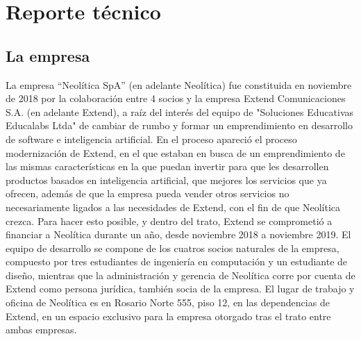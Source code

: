 \section{Reporte técnico}

 

\subsection{La empresa}
La empresa “Neolítica SpA” (en adelante Neolítica) fue constituida en noviembre de 2018 por la colaboración entre 4 socios y la empresa Extend Comunicaciones S.A. (en adelante Extend), a raíz del interés del equipo de "Soluciones Educativas Educalabs Ltda" de cambiar de rumbo y formar un emprendimiento en desarrollo de software e inteligencia artificial. En el proceso apareció el proceso modernización de Extend, en el que estaban en busca de un emprendimiento de las mismas características en la que puedan invertir para que les desarrollen productos basados en inteligencia artificial, que mejores los servicios que ya ofrecen, además de que la empresa pueda vender otros servicios no necesariamente ligados a las necesidades de Extend, con el fin de que Neolítica crezca. Para hacer esto posible, y dentro del trato, Extend se comprometió a financiar a Neolítica durante un año, desde noviembre 2018 a noviembre 2019.
El equipo de desarrollo se compone de los cuatros socios naturales de la empresa, compuesto por tres estudiantes de ingeniería en computación y un estudiante de diseño, mientras que la administración y gerencia de Neolítica corre por cuenta de Extend como persona jurídica, también socia de la empresa.
El lugar de trabajo y oficina de Neolítica es en Rosario Norte 555, piso 12, en las dependencias de Extend, en un espacio exclusivo para la empresa otorgado tras el trato entre ambas empresas.

